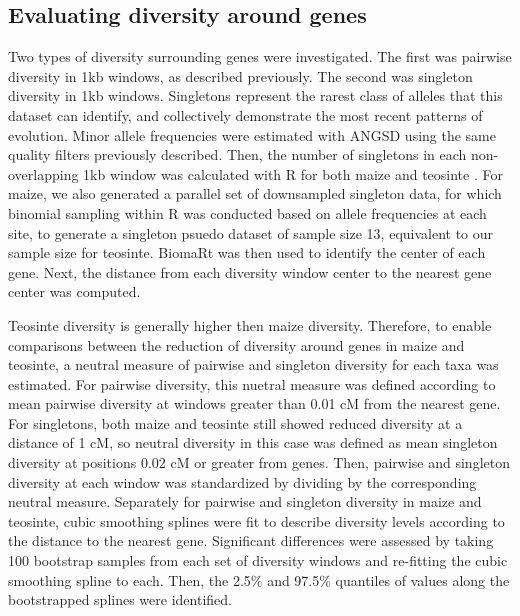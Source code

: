 \documentclass{pnastwo}
\begin{document}
\begin{article}
\begin{materials}
\subsection{Evaluating diversity around genes}
Two types of diversity surrounding genes were investigated. The first
was pairwise diversity in 1kb windows, as described previously. The
second was singleton diversity in 1kb windows. Singletons represent
the rarest class of alleles that this dataset can identify, and
collectively demonstrate the most recent patterns of evolution. Minor
allele frequencies were estimated with ANGSD \cite{korneliussen2014} using the
same quality filters previously described. Then, the number of
singletons in each non-overlapping 1kb window was calculated with R
for both maize and teosinte \cite{R2014}. For maize, we also generated a parallel set of downsampled
singleton data, for which binomial sampling within R was conducted
based on allele frequencies at each site, to generate a singleton
psuedo dataset of sample size 13, equivalent to our sample size for
teosinte. BiomaRt \cite{durinck2009, durinck2005} was then used to identify
the center of each gene. Next, the distance from each diversity window center
to the nearest gene center was computed.

Teosinte diversity is
generally higher then maize diversity. Therefore, to enable comparisons between
the reduction of diversity around genes in maize and teosinte, a
neutral measure of pairwise and singleton diversity for each taxa was
estimated. For pairwise diversity, this nuetral measure was defined according to
mean pairwise diversity at windows greater than 0.01 cM from the nearest
gene. For singletons, both maize and teosinte still showed reduced
diversity at a distance of 1 cM, so neutral diversity in this case was
defined as mean singleton diversity at positions 0.02 cM or greater
from genes. Then, pairwise and singleton diversity at each window was
standardized by dividing by the corresponding neutral
measure. Separately for pairwise and singleton diversity in maize and
teosinte, cubic smoothing splines were fit to
describe diversity levels according to the distance to the nearest
gene. Significant differences were assessed by taking 100 bootstrap
samples from each set of diversity windows and re-fitting the cubic smoothing spline to each. Then, the
2.5\% and 97.5\% quantiles of values along the bootstrapped splines
were identified.


\end{materials}
\end{article}
\end{document}
